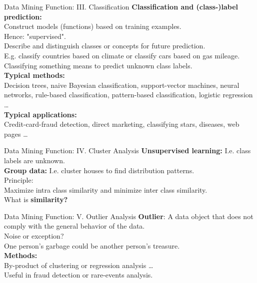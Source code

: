 \begin{frame}{Data Mining Function: III. Classification}
	\textbf{Classification and (class-)label prediction:}\\
	Construct models (functions) based on training examples. \\
	Hence: "supervised".\\
	Describe and distinguish classes or concepts for future prediction.\\
	E.g. classify countries based on climate or classify cars based on gas 
	mileage.\\
	Classifying something means to predict unknown class labels. \\[0.5cm]
	
	\textbf{Typical methods:}\\
	Decision trees, naive Bayesian classification, support-vector machines, 
	neural networks, rule-based classification, pattern-based classification, 
	logistic regression \ldots\\[0.5cm]
	
	\textbf{Typical applications:}\\
	Credit-card-fraud detection, direct marketing, classifying stars, diseases, 
	web pages \ldots
\end{frame}

\begin{frame}{Data Mining Function: IV. Cluster Analysis}
	\textbf{Unsupervised learning:} I.e. class labels are unknown.\\
	\textbf{Group data:} I.e. cluster houses to find distribution 
	patterns.\\[0.5cm]
	
	Principle:\\
	Maximize intra class similarity and minimize inter class 
	similarity.\\[0.5cm]
	
	What is \textbf{similarity?}
\end{frame}

\begin{frame}{Data Mining Function: V. Outlier Analysis}
	\textbf{Outlier}: A data object that does not comply with the general 
	behavior of the data.\\[0.5cm]
	
	Noise or exception?\\
	One person's garbage could be another person's treasure.\\[0.5cm]
	
	\textbf{Methods:}\\
	By-product of clustering or regression analysis \ldots \\
	Useful in fraud detection or rare-events analysis.
\end{frame}

